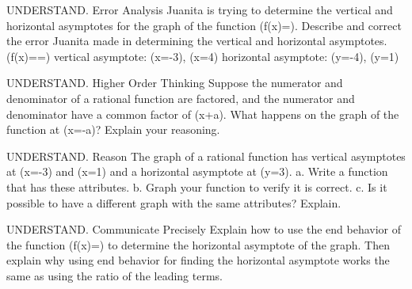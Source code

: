 \documentclass{article}
\newenvironment{practice}[2]{}{}        %
\newcommand{\answer}[1]{}               %
\newcommand{\uncertain}[2]{#1}          %
\newcommand{\te}[1]{}                   %
\begin{document}
\begin{practice}{10}{3}
UNDERSTAND. Error Analysis Juanita is trying to determine the vertical and horizontal asymptotes for the graph of the function (f(x)=).
Describe and correct the error Juanita made in determining the vertical and horizontal asymptotes.
(f(x)==)
vertical asymptote: (x=-3), (x=4)
horizontal asymptote: (y=-4), (y=1)
\te{Printed worked note is marked with a red X.}
\answer{Juanita incorrectly used the zeros of the numerator to find the horizontal asymptote. Because the numerator and denominator have the same degree, the horizontal asymptote is (y=1).}
\end{practice}
\begin{practice}{11}{3}
UNDERSTAND. Higher Order Thinking Suppose the numerator and denominator of a rational function are factored, and the numerator and denominator have a common factor of (x+a). What happens on the graph of the function at (x=-a)? Explain your reasoning.
\te{DOK \uncertain{3}{2; no DOK printed for item 11}.}
\answer{At (x=-a), there is a hole in the graph. When simplifying the function, the common factors cancel each other out and appear to not be part of the graph. But (-a) is excluded from the domain. You can clearly see the hole using ZDecimal on a calculator if (a) is rational.}
\te{Printed answer presumes no remaining denominator factor vanishes at -a.}
\end{practice}
\begin{practice}{12}{2}
UNDERSTAND. Reason The graph of a rational function has vertical asymptotes at (x=-3) and (x=1) and a horizontal asymptote at (y=3).
a. Write a function that has these attributes.
b. Graph your function to verify it is correct.
c. Is it possible to have a different graph with the same attributes? Explain.
\answer{See back of book.}
\end{practice}
\begin{practice}{13}{3}
UNDERSTAND. Communicate Precisely Explain how to use the end behavior of the function (f(x)=) to determine the horizontal asymptote of the graph. Then explain why using end behavior for finding the horizontal asymptote works the same as using the ratio of the leading terms.
\answer{Substitute large (|x|) values; the (y)-values approach (\frac14). (x^2) dominates (x) and unit terms for large (|x|) values, so only the ratio is needed to determine the horizontal asymptote.}
\end{practice}
\end{document}
